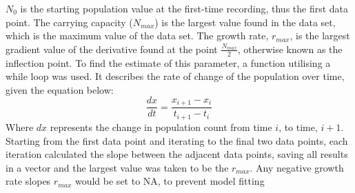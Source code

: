 \documentclass[11pt]{article}
\begin{document}
$N_0$ is the starting population value at the first-time recording, thus the first data point. The carrying capacity ($N_{max}$) is the largest value found in the data set, which is the maximum value of the data set. The growth rate, $r_{max}$, is the largest gradient value of the derivative found at the point $\frac{N_{max}}{2}$, otherwise known as the inflection point. To find the estimate of this parameter, a function utilising a while loop was used. It describes the rate of change of the population over time, given the equation below:
\begin{equation*}
    \frac{dx}{dt}=\frac{x_{i+1}-x_{i}}{t_{i+1}-t_{i}}\label{eq:slope} \tag{4}
\end{equation*}
Where $dx$ represents the change in population count from time $i$, to time, $i+1$. Starting from the first data point and iterating to the final two data points, each iteration calculated the slope between the adjacent data points, saving all results in a vector and the largest value was taken to be the $r_{max}$. Any negative growth rate slopes $r_{max}$ would be set to NA, to prevent model fitting
\end{document}
